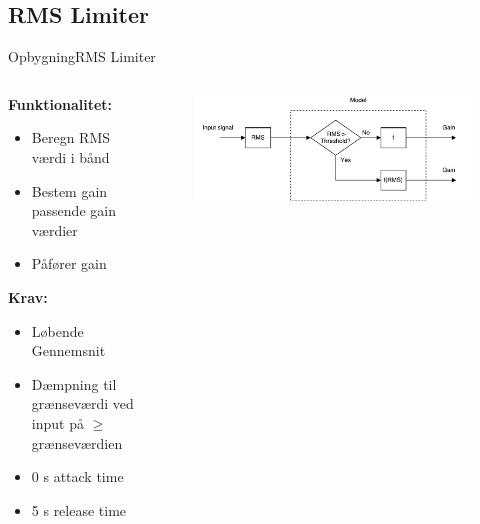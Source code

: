 

\subsection{RMS Limiter}
\begin{frame}{Opbygning}{RMS Limiter}
\begin{columns}
  \begin{column}{0.4\textwidth}
  \textbf{Funktionalitet:}
\begin{itemize}
\item Beregn RMS værdi i bånd
\item Bestem gain passende gain værdier
\item Påfører gain
\end{itemize}
\textbf{Krav:}
\begin{itemize}
\item Løbende Gennemsnit
\item \alert{Dæmpning til grænseværdi ved input på $\geq$ grænseværdien}
\item 0 s attack time
\item 5 s release time
\end{itemize}
  \end{column}

  \begin{column}{0.6\textwidth}
\begin{figure}
\centering
\includegraphics[width=\textwidth]{designRealRMS}
\end{figure}


  \end{column}
\end{columns}
\end{frame}

